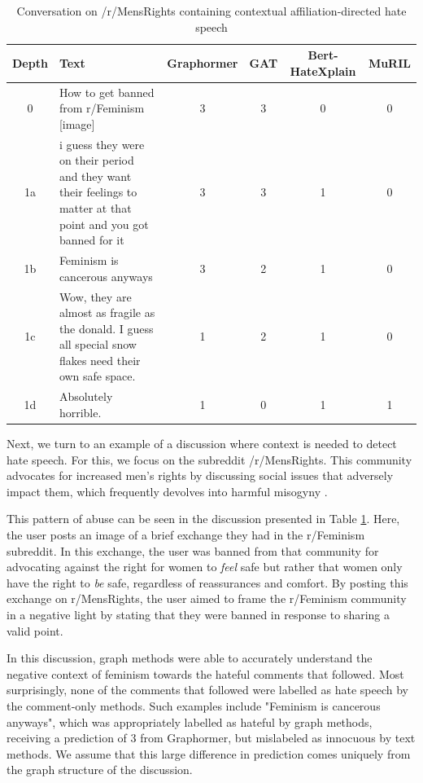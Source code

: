 \documentclass[letterpaper]{article} %
\newcommand{\edit}[1]{{#1}}
\begin{document}
\begin{table}
    \centering
        \caption{Conversation on /r/MensRights containing contextual affiliation-directed hate speech}
    \begin{tabular}{c|p{8cm}|c|c|c|c}
        Depth & Text & Graphormer & GAT & Bert-HateXplain & MuRIL \\
        \hline
        \hline
        0 & How to get banned from r/Feminism [image] & 3 & 3 & 0 & 0 \\
        \hline
        1a & i guess they were on their period and they want their feelings to matter at that point and you got banned for it & 3 & 3 & 1 & 0  \\
        \hline 
        1b & Feminism is cancerous anyways & 3 & 2 & 1 & 0  \\
        \hline
        1c & Wow, they are almost as fragile as the donald. I guess all special snow flakes need their own safe space. & 1 & 2 & 1 & 0 \\
        \hline
        1d & Absolutely horrible. & 1 & 0 & 1 & 1 \\
    \end{tabular}
    \label{tab:contextual-mens-rights}
\end{table}
Next, we turn to an example of a discussion where context is needed to detect hate speech. \edit{For this, we focus on the subreddit /r/MensRights.  This community advocates for increased men's rights by discussing social issues that adversely impact them, which frequently devolves into harmful misogyny \cite{socsci5020018}}.

This pattern of abuse can be seen in the discussion presented in Table \ref{tab:contextual-mens-rights}. Here, the user posts an image of a brief exchange they had in the r/Feminism subreddit. In this exchange, the user was banned from that community for advocating against the right for women to \textit{feel} safe but rather that women only have the right to \textit{be} safe, regardless of reassurances and comfort. By posting this exchange on r/MensRights, the user aimed to frame the r/Feminism community in a negative light by stating that they were banned in response to sharing a valid point. 

In this discussion, graph methods were able to accurately understand the negative context of feminism towards the hateful comments that followed. Most surprisingly, none of the comments that followed were labelled as hate speech by the comment-only methods. Such examples include "Feminism is cancerous anyways", which was appropriately labelled as hateful by graph methods, receiving a prediction of 3 from Graphormer, but mislabeled as innocuous by text methods. We assume that this large difference in prediction comes uniquely from the graph structure of the discussion. 
\end{document}
